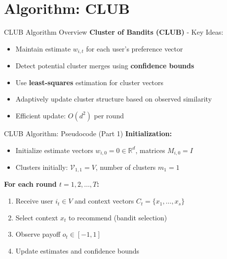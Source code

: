 \documentclass[11pt]{beamer}
\begin{document}
\section{Algorithm: CLUB}

\begin{frame}{CLUB Algorithm Overview}
  \textbf{Cluster of Bandits (CLUB)} - Key Ideas:
  \begin{itemize}
    \item Maintain estimate $w_{i,t}$ for each user's preference vector
    \item Detect potential cluster merges using \textbf{confidence bounds}
    \item Use \textbf{least-squares} estimation for cluster vectors
    \item Adaptively update cluster structure based on observed similarity
    \item Efficient update: $O(d^2)$ per round
  \end{itemize}
\end{frame}

\begin{frame}{CLUB Algorithm: Pseudocode (Part 1)}
  \textbf{Initialization:}
  \begin{itemize}
    \item Initialize estimate vectors $w_{i,0} = 0 \in \mathbb{R}^d$, matrices $M_{i,0} = I$
    \item Clusters initially: $\mathcal{V}_{1,1} = V$, number of clusters $m_1 = 1$
  \end{itemize}
  
  \textbf{For each round $t = 1, 2, \ldots, T$:}
  \begin{enumerate}
    \item Receive user $i_t \in V$ and context vectors $C_t = \{x_1, \ldots, x_s\}$
    \item Select context $x_t$ to recommend (bandit selection)
    \item Observe payoff $o_t \in [-1, 1]$
    \item Update estimates and confidence bounds
  \end{enumerate}
\end{frame}
\end{document}
